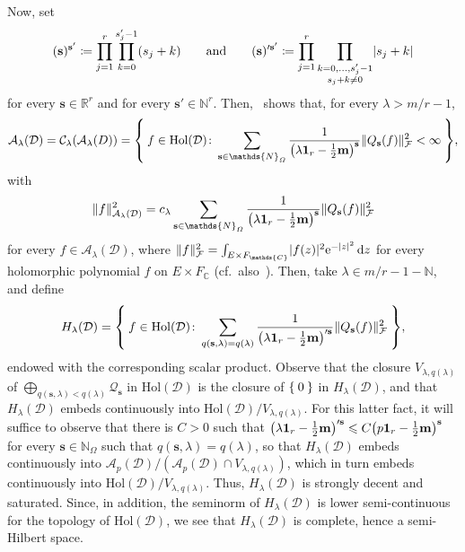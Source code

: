 \documentclass[10.5pt,reqno]{amsart}
\newcommand{\Hol}{\mathrm{Hol}}
\newcommand{\ee}{\mathrm{e}}
\newcommand{\vect}[1]{\mathbf{{#1}}}
\newcommand{\dd}{\mathrm{d}}
\DeclarePairedDelimiter{\abs}{\lvert}{\rvert}
\DeclarePairedDelimiter{\norm}{\lVert}{\rVert}
\let\originalleft\left
\let\originalright\right
\renewcommand{\left}{\mathopen{}\mathclose\bgroup\originalleft}
\renewcommand{\right}{\aftergroup\egroup\originalright}
\newcommand{\N}{\mathds{N}}
\newcommand{\C}{\mathds{C}}
\newcommand{\R}{\mathds{R}}
\newcommand{\Ac}{\mathcal{A}}
\newcommand{\Cc}{\mathcal{C}}
\newcommand{\Dc}{\mathcal{D}}
\newcommand{\Fc}{\mathcal{F}}
\newcommand{\Qc}{\mathcal{Q}}
\newcommand{\meg}{\leqslant}
\begin{document}
Now, set 
\[
(\vect s)^{\vect s'}\coloneqq \prod_{j=1}^r \prod_{k=0}^{s'_j-1} (s_j+k) \qquad \text{and}\qquad (\vect s)'^{\vect s'}\coloneqq \prod_{j=1}^r \prod_{\substack{k=0,\dots,s'_j-1\\s_j+k\neq 0}} \abs{s_j+k}
\]
for every $\vect s\in \R^r$ and for every $\vect s'\in \N^r$. Then,~\cite[Theorem 3.8]{FarautKoranyi2} shows that, for every $\lambda>m/r-1$,
\[
\Ac_\lambda(\Dc)=\Cc_\lambda(\Ac_\lambda(D))=\Set{f\in \Hol(\Dc)\colon \sum_{\vect s\in \N_\Omega} \frac{1}{\left(\lambda\vect1_r-\frac 1 2 \vect m \right)^{\vect s}} \norm{Q_{\vect s}(f)}_{\Fc}^2<\infty},
\]
with
\[
\norm{f}_{\Ac_\lambda(\Dc)}^2=c_\lambda \sum_{\vect s\in \N_\Omega} \frac{1}{\left(\lambda \vect1_r-\frac 1 2 \vect m \right)^{\vect s}} \norm{Q_{\vect s}(f)}_{\Fc}^2
\]
for every $f\in \Ac_\lambda(\Dc)$, where $\norm{f}_{\Fc}^2=\int_{E\times F_\C} \abs{f(z)}^2 \ee^{-\abs{z}^2}\,\dd z$ for every holomorphic polynomial $f$ on $E\times F_\C$ (cf.~also~\cite[Proposition XI.1.1]{FarautKoranyi}). Then, take $\lambda\in m/r-1-\N$, and define
\[
H_\lambda(\Dc)=\Set{f\in \Hol(\Dc)\colon \sum_{q(\vect s,\lambda)=q(\lambda)} \frac{1}{\left(\lambda \vect1_r-\frac 1 2 \vect m \right)'^{\vect s}} \norm{Q_{\vect s}(f)}_{\Fc}^2},
\]
endowed with the corresponding scalar product. Observe that the closure $V_{\lambda,q(\lambda)}$ of $\bigoplus_{q(\vect s,\lambda)<q(\lambda)} \Qc_{\vect s}$ in $\Hol(\Dc)$ is the closure of $\Set{0}$ in $H_\lambda(\Dc)$, and that $H_\lambda(\Dc)$ embeds continuously into $\Hol(\Dc)/V_{\lambda,q(\lambda)} $. For this latter fact, it will suffice to observe that there is  $C>0$ such that $\left(\lambda\vect 1_r -\frac 1 2 \vect m\right)'^{\vect s} \meg C \left(p\vect 1_r -\frac 1 2 \vect m\right)^{\vect s}$ for every $\vect s\in \N_\Omega$ such that $q(\vect s,\lambda)=q(\lambda)$, so that $H_\lambda(\Dc)$ embeds continuously into $\Ac_p(\Dc)/(\Ac_p(\Dc)\cap V_{\lambda,q(\lambda)})$, which in turn embeds continuously into $\Hol(\Dc)/V_{\lambda,q(\lambda)}$. Thus, $H_\lambda(\Dc)$ is strongly decent and saturated. Since, in addition, the seminorm of $H_\lambda(\Dc)$ is lower semi-continuous for the topology of $\Hol(\Dc)$, we see that $H_\lambda(\Dc)$ is complete, hence a semi-Hilbert space. 
\end{document}
